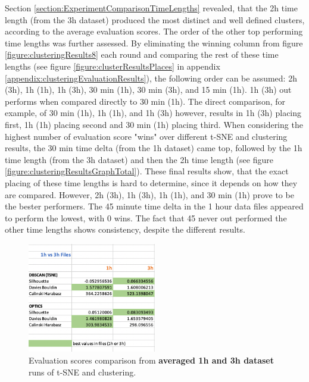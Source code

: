 Section \ref{section:ExperimentComparisonTimeLengths} revealed, that the 2h time length (from the 3h dataset) produced the most distinct and well defined clusters, according to the average evaluation scores. The order of the other top performing time lengths was further assessed. By eliminating the winning column from figure \ref{figure:clusteringResults8} each round and comparing the rest of these time lengths (see figure \ref{figure:clusterResultsPlaces} in appendix \ref{appendix:clusteringEvaluationResults}), the following order can be assumed: 2h (3h), 1h (1h), 1h (3h), 30 min (1h), 30 min (3h), and 15 min (1h). 1h (3h) out performs when compared directly to 30 min (1h). The direct comparison, for example, of 30 min (1h), 1h (1h), and 1h (3h) however, results in 1h (3h) placing first, 1h (1h) placing second and 30 min (1h) placing third. When considering the highest number of evaluation score "wins" over different t-SNE and clustering results, the 30 min time delta (from the 1h dataset) came top, followed by the 1h time length (from the 3h dataset) and then the 2h time length (see figure \ref{figure:clusteringResultsGraphTotal}). These final results show, that the exact placing of these time lengths is hard to determine, since it depends on how they are compared. However, 2h (3h), 1h (3h), 1h (1h), and 30 min (1h) prove to be the bester performers.
The 45 minute time delta in the 1 hour data files appeared to perform the lowest, with 0 wins. The fact that 45 never out performed the other time lengths shows consistency, despite the different results.
 


\begin{figure}
  \centering
  \includegraphics[width=0.5\textwidth]{./images/clusteringResults/clusteringResults7.png}
  \caption{Evaluation scores comparison from \textbf{averaged 1h and 3h dataset} runs of t-SNE and clustering.}
  \label{figure:clusteringResults7}
\end{figure}



